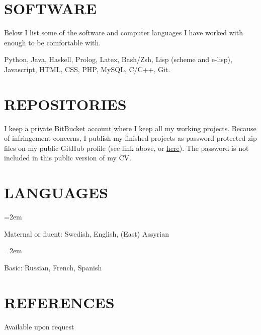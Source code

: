 \documentclass[paper=a4,fontsize=11pt]{scrartcl} %
\newlength{\spacebox}
\newcommand{\NewPart}[1]{\section*{\uppercase{#1}}}
\newcommand{\PersonalEntry}[2]{
		\noindent\hangindent=2em\hangafter=0 %
		\parbox{\spacebox}{        %
		\textit{#1}}		       %
		\hspace{1.5em} #2 \par}    %
\newcommand{\SkillsEntry}[2]{      %
		\noindent\hangindent=2em\hangafter=0 %
		\parbox{\spacebox}{        %
		\textit{#1}}			   %
		\hspace{1.5em} #2 \par}    %
\begin{document}
\NewPart{Software}{}

Below I list some of the software and computer languages I have worked with enough to be comfortable with.

Python, Java, Haskell, Prolog, Latex, Bash/Zsh, Lisp (scheme and e-lisp), Javascript, HTML, CSS, PHP, MySQL, C/C++, Git.

\NewPart{Repositories}

I keep a private BitBucket account where I keep all my working projects. Because of infringement concerns, I publish my finished projects as password protected zip files on my public GitHub profile (see link above, or \href{https://github.com/yyzjohann}{here}). The password is not included in this public version of my CV.


\NewPart{Languages}{}

\SkillsEntry{}{Maternal or fluent: Swedish, English, (East) Assyrian}
\SkillsEntry{}{Basic: Russian, French, Spanish}


\NewPart{References}{}
Available upon request
\end{document}
